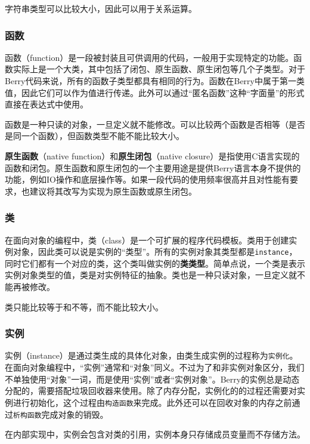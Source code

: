 字符串类型可以比较大小，因此可以用于关系运算。

\subsubsection{函数}

函数（function）是一段被封装且可供调用的代码，一般用于实现特定的功能。函数实际上是一个大类，其中包括了闭包、原生函数、原生闭包等几个子类型。对于Berry代码来说，所有的函数子类型都具有相同的行为。函数在Berry中属于第一类值，因此它们可以作为值进行传递。此外可以通过``匿名函数''这种``字面量''的形式直接在表达式中使用。

函数是一种只读的对象，一旦定义就不能修改。可以比较两个函数是否相等（是否是同一个函数），但函数类型不能不能比较大小。

\textbf{原生函数}（native function）和\textbf{原生闭包}（native closure）是指使用C语言实现的函数和闭包。原生函数和原生闭包的一个主要用途是提供Berry语言本身不提供的功能，例如IO操作和底层操作等。如果一段代码的使用频率很高并且对性能有要求，也建议将其改写为实现为原生函数或原生闭包。

\subsubsection{类}

在面向对象的编程中，类（class）是一个可扩展的程序代码模板。类用于创建实例对象，因此类可以说是实例的``类型''。所有的实例对象其类型都是\texttt{instance}，同时它们都有一个对应的类，这个类叫做实例的\textbf{类类型}。简单点说，一个类是表示实例对象类型的值，类是对实例特征的抽象。类也是一种只读对象，一旦定义就不能再被修改。

类只能比较等于和不等，而不能比较大小。

\subsubsection{实例}

实例（instance）是通过类生成的具体化对象，由类生成实例的过程称为\texttt{实例化}。在面向对象编程中，``实例''通常和``对象''同义。不过为了和非实例对象区分，我们不单独使用``对象''一词，而是使用``实例''或者``实例对象''。Berry的实例总是动态分配的，需要搭配垃圾回收器来使用。除了内存分配，实例化的的过程还需要对实例进行初始化，这个过程由\texttt{构造函数}来完成。此外还可以在回收对象的内存之前通过\texttt{析构函数}完成对象的销毁。

在内部实现中，实例会包含对类的引用，实例本身只存储成员变量而不存储方法。

